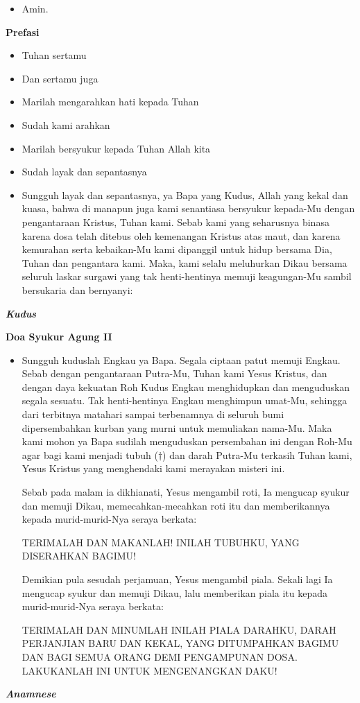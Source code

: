 \documentclass[a5paper,headsepline,titlepage,10pt]{scrbook}
\makeatletter
\newcommand{\subjudul}[1]{%
  {\parindent \z@ \normalfont
    \interlinepenalty\@M \bfseries #1\par\nobreak \vskip 20\p@ }}
\newcommand{\lagu}[1]{%
  {\parindent \z@ \normalfont
    \interlinepenalty\@M \bfseries \emph{#1}\par\nobreak \vskip 20\p@ }}
\newcommand{\BU}[1]{\begin{itemize} \item[U:] #1 \end{itemize}}
\newcommand{\BI}[1]{\begin{itemize} \item[I:] #1 \end{itemize}}
\makeatother
\begin{document}
\BU{Amin.}

\subjudul{Prefasi}

\BI{Tuhan sertamu}
\BU{Dan sertamu juga}
\BI{Marilah mengarahkan hati kepada Tuhan}
\BU{Sudah kami arahkan}
\BI{Marilah bersyukur kepada Tuhan Allah kita}
\BU{Sudah layak dan sepantasnya}
\BI{Sungguh layak dan sepantasnya, ya Bapa yang Kudus, Allah yang kekal dan kuasa, bahwa di manapun juga kami senantiasa bersyukur kepada-Mu dengan pengantaraan Kristus, Tuhan kami. Sebab kami yang seharusnya binasa karena dosa telah ditebus oleh kemenangan Kristus atas maut, dan karena kemurahan serta kebaikan-Mu kami dipanggil untuk hidup bersama Dia, Tuhan dan pengantara kami. Maka, kami selalu meluhurkan Dikau bersama seluruh laskar surgawi yang tak henti-hentinya memuji keagungan-Mu sambil bersukaria dan bernyanyi:}

\lagu{Kudus}

\subjudul{Doa Syukur Agung II}

\BI{Sungguh kuduslah Engkau ya Bapa. Segala ciptaan patut memuji Engkau. Sebab dengan pengantaraan Putra-Mu, Tuhan kami Yesus Kristus, dan dengan daya kekuatan Roh Kudus Engkau menghidupkan dan menguduskan segala sesuatu. Tak henti-hentinya Engkau menghimpun umat-Mu, sehingga dari terbitnya matahari sampai terbenamnya di seluruh bumi dipersembahkan kurban yang murni untuk memuliakan nama-Mu. Maka kami mohon ya Bapa sudilah menguduskan persembahan ini dengan Roh-Mu agar bagi kami menjadi tubuh ($\dagger$) dan darah Putra-Mu terkasih Tuhan kami, Yesus Kristus yang menghendaki kami merayakan misteri ini.

Sebab pada malam ia dikhianati, Yesus mengambil roti, Ia mengucap syukur dan memuji Dikau, memecahkan-mecahkan roti itu dan memberikannya kepada murid-murid-Nya seraya berkata:

TERIMALAH DAN MAKANLAH! INILAH TUBUHKU, YANG DISERAHKAN BAGIMU!

Demikian pula sesudah perjamuan, Yesus mengambil piala. Sekali lagi Ia mengucap syukur dan memuji Dikau, lalu memberikan piala itu kepada murid-murid-Nya seraya berkata:

TERIMALAH DAN MINUMLAH INILAH PIALA DARAHKU, DARAH PERJANJIAN BARU DAN KEKAL, YANG DITUMPAHKAN BAGIMU DAN BAGI SEMUA ORANG DEMI PENGAMPUNAN DOSA. LAKUKANLAH INI UNTUK MENGENANGKAN DAKU!}

\lagu{Anamnese}
\end{document}
